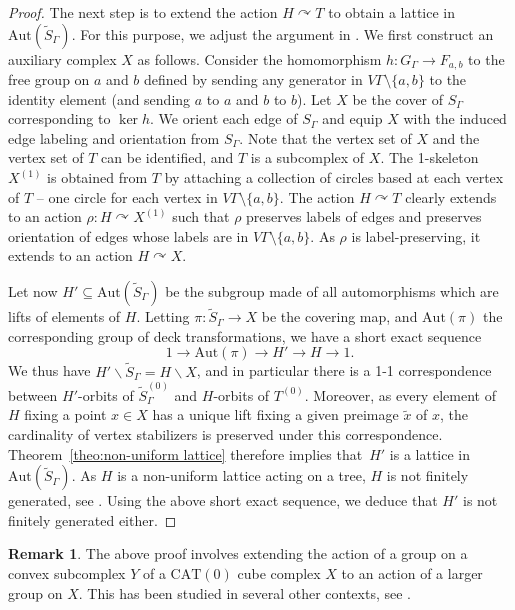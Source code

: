 \documentclass[JEP,XML,SOM,Unicode,NoFloatCountersInSection,published]{cedram}
\theoremstyle{plain}
\theoremstyle{definition}
\newtheorem{rk}[theo]{Remark}
\let\actson\curvearrowright
\newcommand{\Aut}{\mathrm{Aut}}
\begin{document}
\begin{proof}
The next step is to extend the action $H\actson T$ to obtain a lattice in $\Aut(\widetilde S_\Gamma)$. For this purpose, we adjust the argument in \cite[Th.\,9.5]{Hua2}. We first construct an auxiliary complex $X$ as follows. Consider the homomorphism $h:G_\Gamma\to F_{a,b}$ to the free group on $a$ and $b$ defined by sending any generator in $V\Gamma\setminus\{a,b\}$ to the identity element (and sending $a$ to $a$ and $b$ to $b$). Let $X$ be the cover of $S_\Gamma$ corresponding to $\ker h$. We orient each edge of $S_\Gamma$ and equip $X$ with the induced edge labeling and orientation from $S_\Gamma$. Note that the vertex set of $X$ and the vertex set of $T$ can be identified, and $T$ is a subcomplex of $X$. The 1-skeleton $X^{(1)}$ is obtained from $T$ by attaching a collection of circles based at each vertex of $T$ -- one circle for each vertex in $V\Gamma\setminus\{a,b\}$. The action $H\actson T$ clearly extends to an action $\rho:H\actson X^{(1)}$ such that $\rho$ preserves labels of edges and preserves orientation of edges whose labels are in $V\Gamma\setminus\{a,b\}$. As $\rho$ is label-preserving, it extends to an action $H\actson X$.

Let now $H'\subseteq \Aut(\widetilde{S}_\Gamma)$ be the subgroup made of all automorphisms which are lifts of elements of $H$. Letting $\pi:\widetilde{S}_\Gamma\to X$ be the covering map, and $\Aut(\pi)$ the corresponding group of deck transformations, we have a short exact sequence
\[
1\to\Aut(\pi)\to H'\to H\to 1.
\]
We thus have $H'\backslash\widetilde S_\Gamma=H\backslash X$, and in particular there is a 1-1 correspondence between $H'$-orbits of $\widetilde S^{(0)}_\Gamma$ and $H$-orbits of $T^{(0)}$. Moreover, as every element of $H$ fixing a point $x\in X$ has a unique lift fixing a given preimage $\widetilde{x}$ of $x$, the cardinality of vertex stabilizers is preserved under this correspondence. Theorem~\ref{theo:non-uniform lattice} therefore implies that~$H'$ is a lattice in $\Aut(\widetilde S_\Gamma)$. As $H$ is a non-uniform lattice acting on a tree, $H$ is not finitely generated, see \cite[Cor.\,5.16]{bass2001tree}. Using the above short exact sequence, we deduce that $H'$ is not finitely generated either.
\end{proof}

\begin{rk}
The above proof involves extending the action of a group on a convex subcomplex $Y$ of a $\mathrm{CAT}(0)$ cube complex $X$ to an action of a larger group on $X$. This has been studied in several other contexts, see \eg \cite{haglund2008finite,haglund2008special}.
\end{rk}
\end{document}
